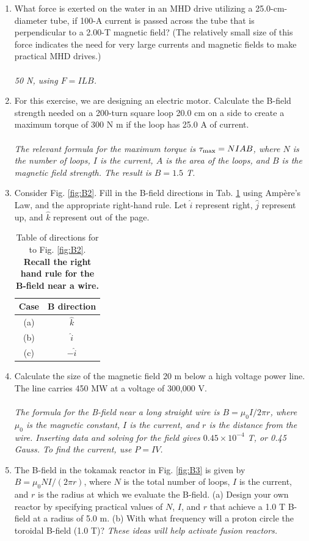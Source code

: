 \documentclass[12pt,twocolumn]{article}
\begin{document}
\begin{enumerate}
\item What force is exerted on the water in an MHD drive utilizing a 25.0-cm-diameter tube, if 100-A current is passed across the tube that is perpendicular to a 2.00-T magnetic field? (The relatively small size of this force indicates the need for very large currents and magnetic fields to make practical MHD drives.) \\ \\
\textit{50 N, using $F = ILB$.}
\item For this exercise, we are designing an electric motor.  Calculate the B-field strength needed on a 200-turn square loop 20.0 cm on a side to create a maximum torque of 300 N m if the loop has 25.0 A of current.  \\ \\
\textit{The relevant formula for the maximum torque is $\tau_{\rm max} = NIAB$, where $N$ is the number of loops, $I$ is the current, $A$ is the area of the loops, and $B$ is the magnetic field strength.  The result is $B = 1.5$ T.}
\item Consider Fig. \ref{fig:B2}.  Fill in the B-field directions in Tab. \ref{tab:ex2} using Amp\`{e}re's Law, and the appropriate right-hand rule. Let $\hat{i}$ represent right, $\hat{j}$ represent up, and $\hat{k}$ represent out of the page.
\begin{table}
\centering
\begin{tabular}{| c | c |}
\hline
Case & B direction \\ \hline
(a) & $\hat{k}$ \\ \hline
(b) & $\hat{i}$ \\ \hline
(c) & $-\hat{i}$ \\ \hline
\end{tabular}
\caption{\label{tab:ex2} Table of directions for to Fig. \ref{fig:B2}. \textbf{Recall the right hand rule for the B-field near a wire.}}
\end{table}
\item Calculate the size of the magnetic field 20 m below a high voltage power line. The line carries 450 MW at a voltage of 300,000 V. \\ \\
\textit{The formula for the B-field near a long straight wire is $B = \mu_0 I/2\pi r$, where $\mu_0$ is the magnetic constant, $I$ is the current, and $r$ is the distance from the wire.  Inserting data and solving for the field gives $0.45 \times 10^{-4}$ T, or 0.45 Gauss.  To find the current, use $P = IV$.}
\item The B-field in the tokamak reactor in Fig. \ref{fig:B3} is given by $B = \mu_0 N I / (2\pi r)$, where $N$ is the total number of loops, $I$ is the current, and $r$ is the radius at which we evaluate the B-field.  (a) Design your own reactor by specifying practical values of $N$, $I$, and $r$ that achieve a 1.0 T B-field at a radius of 5.0 m.  (b) With what frequency will a proton circle the toroidal B-field (1.0 T)?  \textit{These ideas will help activate fusion reactors.} \\ \\

\end{enumerate}
\end{document}

